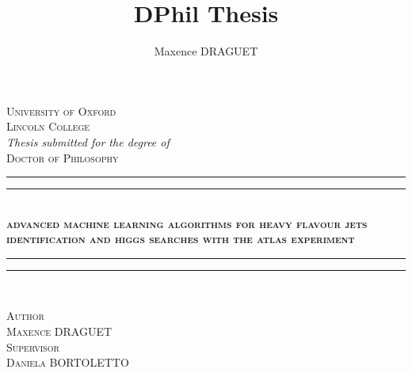 \documentclass[11pt,a4paper]{report}
\author{Maxence DRAGUET}
\title{DPhil Thesis}
\begin{document}
\begin{titlepage}
\pagecolor{oxfordblue}    

\newcommand{\HRule}{\rule{\linewidth}{0.5mm}}
\center 
\vspace*{2cm}
\textsc{\LARGE \color{white} University of Oxford}\\
\textsc{\large \color{white} Lincoln College}\\[1cm]
\textit{\large \color{white} Thesis submitted for the degree of} \\
\textsc{\Large \color{white} Doctor of Philosophy}\\[2cm]

{\color{white} \HRule \HRule} \\[0.4cm]
\textsc{\huge \bfseries \color{white} advanced machine learning algorithms for heavy flavour jets identification and higgs searches with the atlas experiment}\\[0.4cm] 
{\color{white} \HRule \HRule}\\[1.5cm]
\color{white}
    \begin{minipage}{0.4\textwidth}
    \begin{center}
    \textsc{Author\\[0.2cm]
    \Large Maxence DRAGUET}\\[0.3cm]
    \textsc{Supervisor\\[0.2cm]
    \Large Daniela BORTOLETTO}\\
		
    \end{center}
    \end{minipage}


\end{titlepage}
\end{document}
